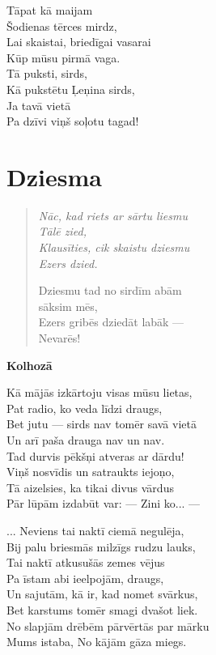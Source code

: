 \documentclass[11pt]{article}
\begin{document}
{Tāpat kā maijam\\
Šodienas tērces mirdz,\\
Lai skaistai, briedīgai vasarai\\
Kūp mūsu pirmā vaga.\\
Tā puksti, sirds,\\
Kā pukstētu Ļeņina sirds,\\
Ja tavā vietā\\
Pa dzīvi viņš soļotu tagad!






\section{Dziesma}

\begin{quote}
{\em
Nāc, kad riets ar sārtu liesmu\\
\mbox{}\hspace{10pt} Tālē zied,\\
Klausīties, cik skaistu dziesmu\\
\mbox{}\hspace{10pt} Ezers dzied.

Dziesmu tad no sirdīm abām\\
\mbox{}\hspace{10pt} sāksim mēs,\\
Ezers gribēs dziedāt labāk ---\\
\mbox{}\hspace{10pt} Nevarēs!
}
\end{quote}


{\bf Kolhozā}

Kā mājās izkārtoju visas mūsu lietas,\\
Pat radio, ko veda līdzi draugs,\\
Bet jutu --- sirds nav tomēr savā vietā\\
Un arī paša drauga nav un nav.\\
Tad durvis pēkšņi atveras ar dārdu!\\
Viņš nosvīdis un satraukts iejoņo,\\
Tā aizelsies, ka tikai divus vārdus\\
Pār lūpām izdabūt var: --- Zini ko... ---

... Neviens tai naktī ciemā negulēja,\\
Bij palu briesmās milzīgs rudzu lauks,\\
Tai naktī atkusušās zemes vējus\\
Pa īstam abi ieelpojām, draugs,\\
Un sajutām, kā ir, kad nomet svārkus,\\
Bet karstums tomēr smagi dvašot liek.\\
No slapjām drēbēm pārvērtās par mārku\\
Mums istaba, No kājām gāza miegs.

}
\end{document}
